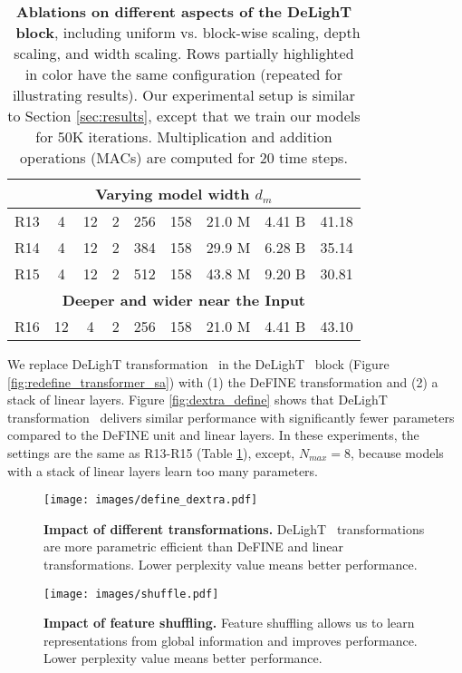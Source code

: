 \begin{table}[t!]
{\begin{tabular}{l|cccc|cccc}
              \toprule[1pt]
              \multicolumn{9}{c}{\textbf{Varying model width $d_m$}} \\
              \midrule 
                R13 & \cellcolor{red!25} 4 & \cellcolor{red!25} 12 & \cellcolor{red!25} 2 & \cellcolor{red!25} 256 & 158 &  21.0 M & 4.41 B & 41.18 \\
                R14 & 4 & 12 & 2 & 384 & 158 & 29.9 M & 6.28 B & 35.14 \\
                R15 & 4 & 12 & 2 & 512 & 158 & 43.8 M & 9.20 B & 30.81 \\
              \toprule[1pt]
              \multicolumn{9}{c}{\textbf{Deeper and wider near the Input}} \\
              \midrule 
               R16 & 12 &  4 & 2 &  256 & 158 &  21.0 M & 4.41 B & 43.10 \\
            \bottomrule[1.5pt]
            \end{tabular}
        }
    \caption{\textbf{Ablations on different aspects of the DeLighT ~block}, including uniform vs. block-wise scaling, depth scaling, and width scaling. Rows partially highlighted in color have the same configuration (repeated for illustrating results). Our experimental setup is similar to Section \ref{sec:results}, except that we train our models for 50K iterations. Multiplication and addition operations (MACs) are computed for 20 time steps. }
    \label{tab:scaling_ablte}
\end{table}

\vspace{1mm}
 We replace DeLighT transformation ~in the DeLighT ~block (Figure \ref{fig:redefine_transformer_sa}) with (1) the DeFINE transformation and (2) a stack of linear layers. Figure \ref{fig:dextra_define} shows that DeLighT transformation ~delivers similar performance with significantly fewer parameters compared to the DeFINE unit and linear layers. In these experiments, the settings are the same as R13-R15 (Table \ref{tab:scaling_ablte}), except, $N_{max}=8$, because models with a stack of linear layers learn too many parameters.

\begin{figure}[b!]
    \centering
    \begin{minipage}{0.45\columnwidth}
        \texttt{[image: images/define\_dextra.pdf]}
        \caption{\textbf{Impact of different transformations.} DeLighT ~transformations are more parametric efficient than DeFINE and linear transformations. Lower perplexity value means better performance.}
    \label{fig:dextra_define}
    \end{minipage}
    \hfill
    \begin{minipage}{0.45\columnwidth}
        \centering
        \texttt{[image: images/shuffle.pdf]}
        \caption{\textbf{Impact of feature shuffling.} Feature shuffling allows us to learn representations from global information and improves performance. Lower perplexity value means better performance.}
        \label{fig:shuffling}
    \end{minipage}
\end{figure}


